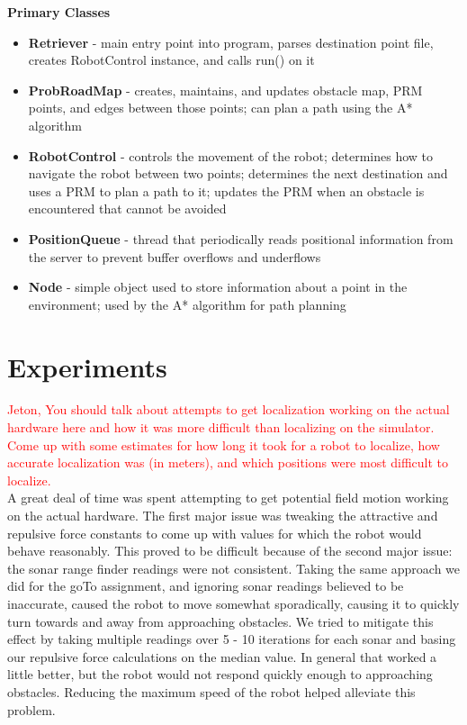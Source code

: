 \documentclass[12pt]{article}
\begin{document}
\textbf{Primary Classes}
\begin{itemize}
\item{\textbf{Retriever} - main entry point into program, parses destination point file, creates RobotControl instance, and calls run() on it}
\item{\textbf{ProbRoadMap} - creates, maintains, and updates obstacle map, PRM points, and edges between those points; 
                       can plan a path using the A* algorithm}
\item{\textbf{RobotControl} - controls the movement of the robot; determines how to navigate the robot between two points; 
                      determines the next destination and uses a PRM to plan a path to it; updates the PRM when an obstacle is encountered 
                      that cannot be avoided}
\item{\textbf{PositionQueue} - thread that periodically reads positional information from the server to prevent buffer overflows and underflows}
\item{\textbf{Node} - simple object used to store information about a point in the environment; used by the A* algorithm for path planning}
\end{itemize}

\newpage
\section{Experiments}

\textcolor{red}{Jeton, You should talk about attempts to get localization working on the actual hardware here and how it was more difficult than localizing on the simulator. Come up with some estimates for how long it took for a robot to localize, how accurate localization was (in meters), and which positions were most difficult to localize. } \\ 

A great deal of time was spent attempting to get potential field motion working on the actual hardware. The first major issue was tweaking the attractive and repulsive force constants to come up with values for which the robot would behave reasonably. This proved to be difficult because of the second major issue: the sonar range finder readings were not consistent. Taking the same approach we did for the goTo assignment, and ignoring sonar readings believed to be inaccurate, caused the robot to move somewhat sporadically, causing it to quickly turn towards and away from approaching obstacles. We tried to mitigate this effect by taking multiple readings over 5 - 10 iterations for each sonar and basing our repulsive force calculations on the median value. In general that worked a little better, but the robot would not respond quickly enough to approaching obstacles. Reducing the maximum speed of the robot helped alleviate this problem.
\end{document}
